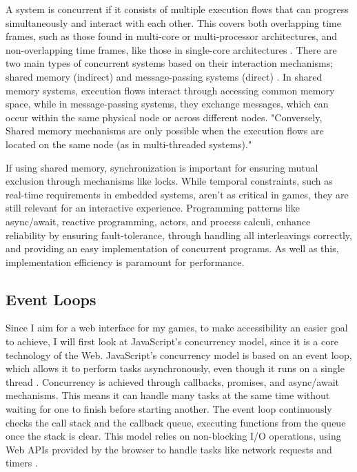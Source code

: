 \documentclass[]{final}
\begin{document}
A system is concurrent if it consists of multiple execution flows that
can progress simultaneously and interact with each other.
This covers both overlapping time frames, such as those found
in multi-core or multi-processor architectures, and non-overlapping
time frames, like those in single-core architectures \cite{bianchi_survey_2018}.
There are two main types of concurrent systems based on their interaction
mechanisms; shared memory (indirect) and message-passing systems (direct) \cite{bianchi_survey_2018}.
In shared memory systems, execution flows interact through accessing
common memory space, while in message-passing systems,
they exchange messages, which can occur within the same physical
node or across different nodes. "Conversely, Shared memory mechanisms
are only possible when the execution flows are
located on the same node (as in multi-threaded systems)."\cite{bianchi_survey_2018}

If using shared memory, synchronization is important
for ensuring mutual exclusion through mechanisms like locks.
While temporal constraints, such as real-time requirements in embedded systems,
aren't as critical in games, they are still relevant for an interactive
experience. Programming patterns like async/await, reactive programming,
actors, and process calculi, enhance reliability by ensuring fault-tolerance,
through handling all interleavings correctly,
and providing an easy implementation of concurrent programs. As well as this, implementation efficiency
is paramount for performance.

\subsection{Event Loops}
Since I aim for a web interface for my games, to make
accessibility an easier goal to achieve, I will first look at JavaScript's
concurrency model, since it is a core technology of the Web.
JavaScript's concurrency model is based on an event loop, which allows it to
perform tasks asynchronously, even though it runs on a single thread \cite{zhao_concurrency_2021}.
Concurrency is achieved through callbacks, promises, and
async/await mechanisms. This means it can handle many tasks at the same time without waiting for one
to finish before starting another. The event loop continuously checks the call
stack and the callback queue, executing functions from the queue once
the stack is clear. This model relies on non-blocking I/O operations,
using Web APIs provided by the browser to handle tasks like network
requests and timers \cite{noauthor_event_2024}.
\end{document}
